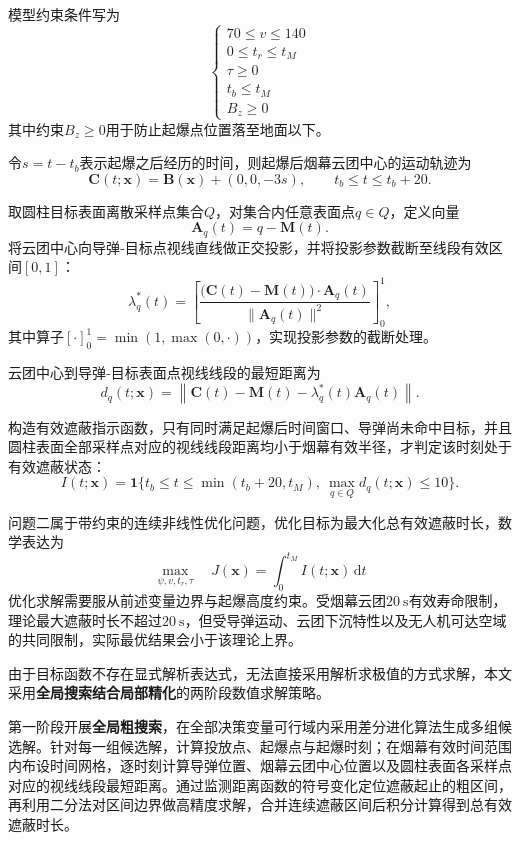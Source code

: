 \documentclass[12pt,a4paper]{article}
\begin{document}
	模型约束条件写为
	\[
	\begin{cases}
		70 \le v \le 140\\
		0 \le t_r \le t_M\\
		\tau \ge 0\\
		t_b \le t_M\\
		B_z \ge 0
	\end{cases}
	\]
	其中约束$B_z\ge0$用于防止起爆点位置落至地面以下。
	
	令$s=t-t_b$表示起爆之后经历的时间，则起爆后烟幕云团中心的运动轨迹为
	\[
	\boldsymbol C(t;\boldsymbol x)=\boldsymbol B(\boldsymbol x)+(0,0,-3s),\qquad t_b\le t \le t_b+20.
	\]
	
	
	取圆柱目标表面离散采样点集合$Q$，对集合内任意表面点$q\in Q$，定义向量
	\[
	\boldsymbol A_q(t)=q-\boldsymbol M(t).
	\]
	将云团中心向导弹‑目标点视线直线做正交投影，并将投影参数截断至线段有效区间$[0,1]$：
	\[
	\lambda_q^*(t)=\left[\frac{\big(\boldsymbol C(t)-\boldsymbol M(t)\big)\cdot \boldsymbol A_q(t)}{\|\boldsymbol A_q(t)\|^2}\right]_0^1,
	\]
	其中算子$[\cdot]_0^1=\min(1,\max(0,\cdot))$，实现投影参数的截断处理。
	
	云团中心到导弹‑目标表面点视线线段的最短距离为
	\[
	d_q(t;\boldsymbol x)=\left\|\boldsymbol C(t)-\boldsymbol M(t)-\lambda_q^*(t)\boldsymbol A_q(t)\right\|.
	\]
	
	构造有效遮蔽指示函数，只有同时满足起爆后时间窗口、导弹尚未命中目标，并且圆柱表面全部采样点对应的视线线段距离均小于烟幕有效半径，才判定该时刻处于有效遮蔽状态：
	\[
	I(t;\boldsymbol x)=\mathbf 1\big\{t_b\le t\le \min(t_b+20,t_M),\ \max_{q\in Q}d_q(t;\boldsymbol x)\le 10\big\}.
	\]
	
	问题二属于带约束的连续非线性优化问题，优化目标为最大化总有效遮蔽时长，数学表达为
	\[
	\boxed{\max_{\psi,v,t_r,\tau}\quad J(\boldsymbol x)=\int_{0}^{t_M} I(t;\boldsymbol x)\,\mathrm{d}t}
	\]
	优化求解需要服从前述变量边界与起爆高度约束。受烟幕云团$20\ \mathrm{s}$有效寿命限制，理论最大遮蔽时长不超过$20\ \mathrm{s}$，但受导弹运动、云团下沉特性以及无人机可达空域的共同限制，实际最优结果会小于该理论上界。
	

	由于目标函数不存在显式解析表达式，无法直接采用解析求极值的方式求解，本文采用\textbf{全局搜索结合局部精化}的两阶段数值求解策略。
	
	第一阶段开展\textbf{全局粗搜索}，在全部决策变量可行域内采用差分进化算法生成多组候选解。针对每一组候选解，计算投放点、起爆点与起爆时刻；在烟幕有效时间范围内布设时间网格，逐时刻计算导弹位置、烟幕云团中心位置以及圆柱表面各采样点对应的视线线段最短距离。通过监测距离函数的符号变化定位遮蔽起止的粗区间，再利用二分法对区间边界做高精度求解，合并连续遮蔽区间后积分计算得到总有效遮蔽时长。
	
\end{document}
